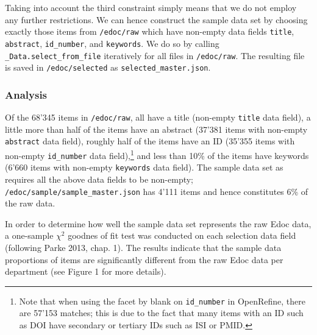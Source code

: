 Taking into account the third constraint simply means that we do not
employ any further restrictions. We can hence construct the sample data
set by choosing exactly those items from \texttt{/edoc/raw} which have
non-empty data fields \texttt{title}, \texttt{abstract},
\texttt{id\_number}, and \texttt{keywords}. We do so by calling
\texttt{\_Data.select\_from\_file} iteratively for all files in
\texttt{/edoc/raw}. The resulting file is saved in
\texttt{/edoc/selected} as \texttt{selected\_master.json}.

\hypertarget{analysis}{%
\subsubsection{Analysis}\label{analysis}}

Of the 68'345 items in \texttt{/edoc/raw}, all have a title (non-empty
\texttt{title} data field), a little more than half of the items have an
abstract (37'381 items with non-empty \texttt{abstract} data field),
roughly half of the items have an ID (35'355 items with non-empty
\texttt{id\_number} data field),\footnote{Note that when using the facet
  by blank on \texttt{id\_number} in OpenRefine, there are 57'153
  matches; this is due to the fact that many items with an ID such as
  DOI have secondary or tertiary IDs such as ISI or PMID.} and less than
10\% of the items have keywords (6'660 items with non-empty
\texttt{keywords} data field). The sample data set as requires all the
above data fields to be non-empty;
\texttt{/edoc/sample/sample\_master.json} has 4'111 items and hence
constitutes 6\% of the raw data.

In order to determine how well the sample data set represents the raw
Edoc data, a one-sample \(\chi^2\) goodnes of fit test was conducted on
each selection data field (following Parke 2013, chap. 1). The results
indicate that the sample data proportions of items are significantly
different from the raw Edoc data per department (see Figure 1 for more
details).

